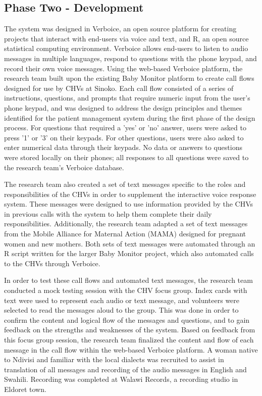 \subsection{Phase Two - Development}
The system was designed in Verboice, an open source platform for creating projects that interact with end-users via voice and text, and R, an open source statistical computing environment. Verboice allows end-users to listen to audio messages in multiple languages, respond to questions with the phone keypad, and  record their own voice messages. Using the web-based Verboice platform, the research team built upon the existing Baby Monitor platform to create call flows designed for use by CHVs at Sinoko. Each call flow consisted of a series of instructions, questions, and prompts that require numeric input from the user's phone keypad, and was designed to address the design principles and themes identified for the patient management system during the first phase of the design process. For questions that required a 'yes' or 'no' answer, users were asked to press '1' or '3' on their keypads. For other questions, users were also asked to enter numerical data through their keypads. No data or answers to questions were stored locally on their phones; all responses to all questions were saved to the research team's Verboice database.  

The research team also created a set of text messages specific to the roles and responsibilities of the CHVs in order to supplement the interactive voice response system. These messages were designed to use information provided by the CHVs in previous calls with the system to help them complete their daily responsibilities. Additionally, the research team adapted a set of text messages from the Mobile Alliance for Maternal Action (MAMA) designed for pregnant women and new mothers. Both sets of text messages were automated through an R script written for the larger Baby Monitor project, which also automated calls to the CHVs through Verboice. 

In order to test these call flows and automated text messages, the research team conducted a mock testing session with the CHV focus group. Index cards with text were used to represent each audio or text message, and volunteers were selected to read the messages aloud to the group. This was done in order to confirm the content and logical flow of the messages and questions, and to gain feedback  on the strengths and weaknesses of the system. Based on feedback from this focus group session, the research team finalized the content and flow of each message in the call flow within the web-based Verboice platform. A woman native to Ndivisi and familiar with the local dialects was recruited to assist in translation of all messages and recording of the audio messages in English and Swahili. Recording was completed at Walawi Records, a recording studio in Eldoret town. 


